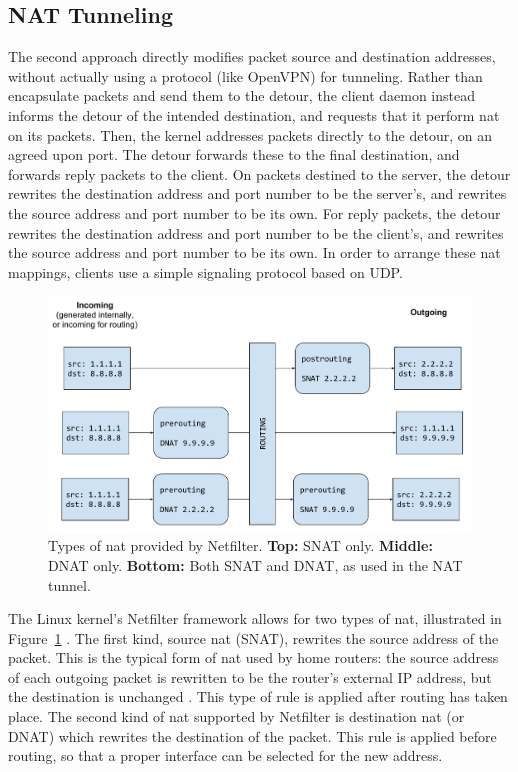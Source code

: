 \documentclass{cwru}
\begin{document}
\subsection{NAT Tunneling}
\label{sec:nat}

The second approach directly modifies packet source and destination addresses,
without actually using a protocol (like OpenVPN) for tunneling. Rather than
encapsulate packets and send them to the detour, the client daemon instead
informs the detour of the intended destination, and requests that it perform
\ac{nat} on its packets. Then, the kernel addresses packets directly to the
detour, on an agreed upon port. The detour forwards these to the final
destination, and forwards reply packets to the client. On packets destined to
the server, the detour rewrites the destination address and port number to be
the server's, and rewrites the source address and port number to be its own. For
reply packets, the detour rewrites the destination address and port number to be
the client's, and rewrites the source address and port number to be its own. In
order to arrange these \ac{nat} mappings, clients use a simple signaling
protocol based on UDP.

\begin{figure}
  \centering
  \includegraphics[height=0.3\textheight]{figures/NATTypes.pdf}
  \caption[Types of \ac{nat} provided by Netfilter]{Types of \ac{nat} provided
    by Netfilter. \textbf{Top:} SNAT only. \textbf{Middle:} DNAT only.
    \textbf{Bottom:} Both SNAT and DNAT, as used in the NAT tunnel.}
  \label{fig:NATTypes}
\end{figure}

The Linux kernel's Netfilter framework allows for two types of \ac{nat},
illustrated in Figure~\ref{fig:NATTypes} \cite{russell2002nat}. The first kind,
source \ac{nat} (SNAT), rewrites the source address of the packet. This is the
typical form of \ac{nat} used by home routers: the source address of each
outgoing packet is rewritten to be the router's external IP address, but the
destination is unchanged \cite{rfc3022}. This type of rule is applied after
routing has taken place. The second kind of \ac{nat} supported by Netfilter is
destination \ac{nat} (or DNAT) which rewrites the destination of the packet.
This rule is applied before routing, so that a proper interface can be selected
for the new address.
\end{document}
